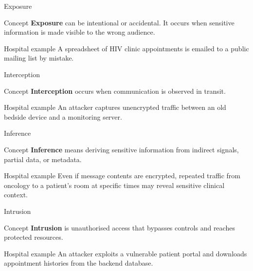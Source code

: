 \documentclass[presentation]{beamer}
\begin{document}
\begin{frame}[c]{Exposure}
\begin{block}{Concept}
\textbf{Exposure} can be intentional or accidental. It occurs when sensitive information is made
visible to the wrong audience.
\end{block}

\begin{exampleblock}{Hospital example}
A spreadsheet of HIV clinic appointments is emailed to a public mailing list by mistake.
\end{exampleblock}
\end{frame}

\begin{frame}[c]{Interception}
\begin{block}{Concept}
\textbf{Interception} occurs when communication is observed in transit.
\end{block}

\begin{exampleblock}{Hospital example}
An attacker captures unencrypted traffic between an old bedside device and a monitoring server.
\end{exampleblock}
\end{frame}

\begin{frame}[c]{Inference}
\begin{block}{Concept}
\textbf{Inference} means deriving sensitive information from indirect signals, partial data, or
metadata.
\end{block}

\begin{exampleblock}{Hospital example}
Even if message contents are encrypted, repeated traffic from oncology to a patient's room at
specific times may reveal sensitive clinical context.
\end{exampleblock}
\end{frame}

\begin{frame}[c]{Intrusion}
\begin{block}{Concept}
\textbf{Intrusion} is unauthorised access that bypasses controls and reaches protected resources.
\end{block}

\begin{exampleblock}{Hospital example}
An attacker exploits a vulnerable patient portal and downloads appointment histories from the
backend database.
\end{exampleblock}
\end{frame}
\end{document}
